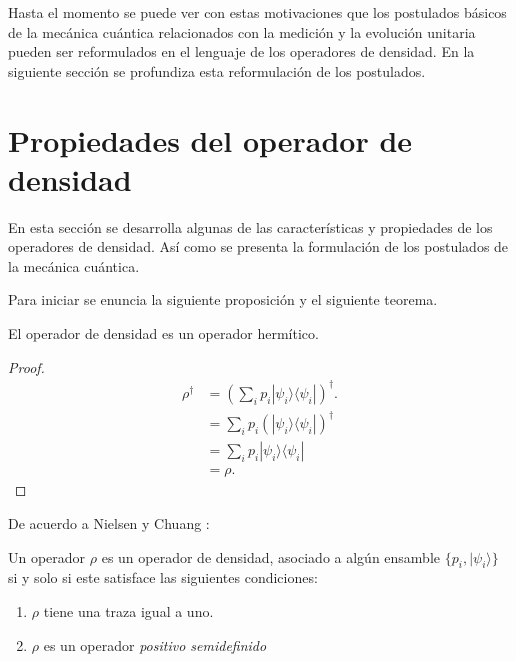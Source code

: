 Hasta el momento se puede ver con estas motivaciones que los postulados básicos de la mecánica cuántica relacionados con la medición y la evolución unitaria pueden ser reformulados en el lenguaje de los operadores de densidad. En la siguiente sección se profundiza esta reformulación de los postulados.


\section{Propiedades del operador de densidad}\label{postulates}

En esta sección se desarrolla algunas de las características y propiedades de los operadores de densidad. Así como se presenta la formulación de los postulados de la mecánica cuántica. 

Para iniciar se enuncia la siguiente proposición y el siguiente teorema. 

\begin{proposition}El operador de densidad es un operador hermítico.
	
\end{proposition}


\begin{proof}
	\begin{equation}
		\begin{split}
			\rho^\dagger&={\left(\sum_{i} p_i|\psi_i\rangle \langle \psi_i|\right)}^{\dagger}.\\
			&=\sum_{i} p_i {\left(|\psi_i\rangle \langle\psi_i|\right)}^{\dagger}\\
			&=\sum_{i} p_i |\psi_i\rangle \langle\psi_i|\\
			&=\rho.
		\end{split}
	\end{equation}
	
\end{proof}

De acuerdo a Nielsen y Chuang {\cite{nielsen_chuang_2010}}:

\begin{theorem} Un operador $\rho$ es un operador de densidad, asociado a algún ensamble $\{p_i, |\psi_i\rangle\}$ si y solo si este satisface las siguientes condiciones:
\begin{enumerate}
	\item $\rho$ tiene una traza igual a uno.
	\item $\rho $ es un operador \textit{positivo semidefinido}
\end{enumerate}	
\end{theorem}


